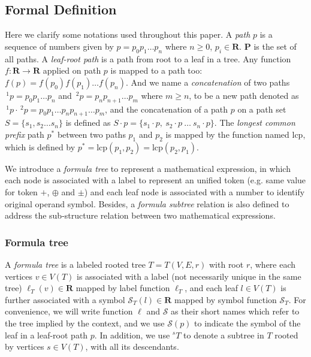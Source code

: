 \documentclass{acm_proc_article-sp}
\begin{document}
\subsection{Formal Definition}
Here we clarify some notations used throughout this paper. 
A \textit{path} $p$ is a sequence of numbers given by $p = p_0 p_1 \ldots p_n$ where $n\ge0$, $p_i \in \mathbf{R}$. $\mathbf{P}$ is the set of all paths.
A \textit{leaf-root path} is a path from root to a leaf in a tree.
Any function $f: \mathbf{R} \rightarrow \mathbf{R}$ applied on path $p$ is mapped to a path too: $f(p)=f(p_0)f(p_1) \ldots f(p_n)$.
And we name  a \textit{concatenation} of two paths $\,^1p = p_0p_1 \ldots p_n$ and $\,^2p = p_np_{n+1} \ldots p_m$ where $m \ge n$, to be a new path denoted as $\,^1p \cdot \,^2p = p_0p_1 \ldots p_n p_{n+1} \ldots p_m$,
and the concatenation of a path $p$ on a path set $S = \{ s_1, s_2 \ldots s_n \}$ is defined as $S \cdot p = \{ s_1\cdot p,\  s_2\cdot p \ \ldots \ s_n\cdot p \}$.
The \textit{longest common prefix} path $p^*$ between two paths $p_1$ and $p_2$ is mapped by the function named $\mathrm{lcp}$, which is defined by $p^* = \mathrm{lcp}(p_1, p_2) = \mathrm{lcp}(p_2, p_1)$.

We introduce a \textit{formula tree} to represent a mathematical expression, in which each node is associated with a label to represent an unified token (e.g. same value for token $+$, $\oplus$ and $\pm$) and each leaf node is associated with a number to identify original operand symbol. 
Besides, a \textit{formula subtree} relation is also defined to address the sub-structure relation between two mathematical expressions.

\subsubsection{Formula tree}
A \textit{formula tree} is a labeled rooted tree $T = T(V,E,r)$ with root $r$, where each vertices $v \in V(T)$ is associated with a label (not necessarily unique in the same tree) $\ell_T(v) \in \mathbf{R}$ mapped by label function $\ell_T$,
and each leaf $l \in V(T)$ is further associated with a symbol $\mathcal{S}_T(l) \in \mathbf{R}$ mapped by symbol function $\mathcal{S}_T$. 
For convenience, we will write function $\ell$ and $\mathcal{S}$ as their short names which refer to the tree implied by the context, and we use $\mathcal{S}(p)$ to indicate the symbol of the leaf in a leaf-root path $p$.
In addition, we use $^s T$ to denote a subtree in $T$ rooted by vertices $s \in V(T)$, with all its descendants.
\end{document}
